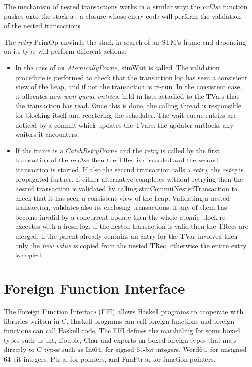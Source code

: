 The mechanism of nested transactions works in a similar way: the \emph{orElse} function pushes onto the stack a , a closure whose entry code will perform the validation of the nested transactions.

The \emph{retry} PrimOp unwinds the stack in search of an STM's frame and depending on its type will perform different actions:
\begin{itemize}
\item
In the case of an \emph{AtomicallyFrame}, stmWait is called.
The validation procedure is performed to check that the transaction log has seen a consistent view of the heap, and if not the transaction is re-run.
In the consistent case, it allocates new \emph{wait-queue entries}, held in  lists attached to the TVars that the transaction has read. 
Once this is done, the calling thread is responsible for blocking itself and reentering the scheduler. The wait queue entries are noticed by a commit which updates the TVars: the updater unblocks any waiters it encounters.
\item
If the frame is a \emph{CatchRetryFrame} and the \emph{retry} is called by the first transaction of the \emph{orElse} then the TRec is discarded and the second transaction is started. If also the second transaction calls a \emph{retry}, the \emph{retry} is propagated further.
If either alternative completes without retrying then the nested transaction is validated by calling stmCommitNestedTransaction to check that it has seen a consistent view of the heap. Validating a nested transaction, validates also its enclosing transactions: if any of them has become invalid by a concurrent update then the whole atomic block re-executes with a fresh log.  If the nested transaction is valid then the TRecs are merged: if the parent already contains an entry for the TVar involved then only the \emph{new value} is copied from the nested TRec, otherwise the entire entry is copied.
\end{itemize}

\section{Foreign Function Interface}
The Foreign Function Interface (FFI) allows Haskell programs to cooperate with libraries written in C.
Haskell programs can call foreign functions and foreign functions can call Haskell code.
The FFI defines the marshaling for some boxed types such us Int, Double, Char and exports un-boxed foreign types that map directly to C types such as Int64, for signed 64-bit integers, Word64, for unsigned 64-bit integers, Ptr a, for pointers, and FunPtr a, for function pointers.

